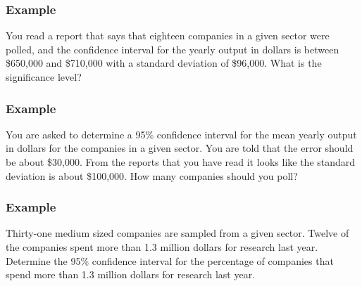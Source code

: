 \begin{frame}
  \frametitle{Example}

  You read a report that says that eighteen companies in a given
  sector were polled, and the confidence interval for the yearly
  output in dollars is between \$650,000 and \$710,000 with a standard
  deviation of \$96,000. What is the significance level?

  \vfill


  \vfill

\end{frame}


\begin{frame}
  \frametitle{Example}

  You are asked to determine a 95\% confidence interval for the mean
  yearly output in dollars for the companies in a given sector. You
  are told that the error should be about \$30,000. From the reports
  that you have read it looks like the standard deviation is about
  \$100,000. How many companies should you poll?

  \vfill


  \vfill


\end{frame}


\begin{frame}
  \frametitle{Example}

  Thirty-one medium sized companies are sampled from a given
  sector. Twelve of the companies spent more than 1.3 million dollars
  for research last year. Determine the 95\% confidence interval for
  the percentage of companies that spend more than 1.3 million dollars
  for research last year.

  \vfill


  \vfill


\end{frame}



